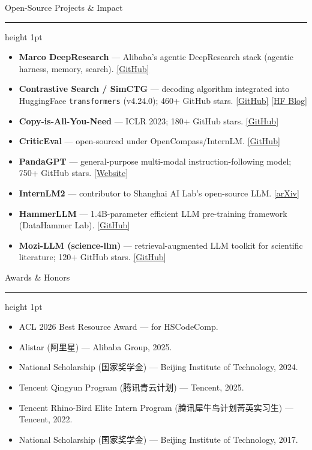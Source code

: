 \documentclass[10.5pt]{article}
\newcommand{\cvsection}[1]{%
  \vspace{10pt}
  {\color{accent}\headingfont\Large #1}\par
  \vspace{2pt}
  {\color{accent}\hrule height 1pt}
  \vspace{6pt}
}
\newcommand{\projlink}[1]{\small\color{accent}[#1]}
\begin{document}
\cvsection{Open-Source Projects \& Impact}
\begin{itemize}
  \item \textbf{Marco DeepResearch} --- Alibaba's agentic DeepResearch stack (agentic harness, memory, search). \href{https://github.com/AIDC-AI/Marco-DeepResearch/}{\projlink{GitHub}}
  \item \textbf{Contrastive Search / SimCTG} --- decoding algorithm integrated into HuggingFace \texttt{transformers} (v4.24.0); 460+ GitHub stars. \href{https://github.com/yxuansu/SimCTG}{\projlink{GitHub}} \href{https://huggingface.co/blog/introducing-csearch}{\projlink{HF Blog}}
  \item \textbf{Copy-is-All-You-Need} --- ICLR 2023; 180+ GitHub stars. \href{https://github.com/gmftbyGMFTBY/Copyisallyouneed}{\projlink{GitHub}}
  \item \textbf{CriticEval} --- open-sourced under OpenCompass/InternLM. \href{https://github.com/open-compass/CriticEval}{\projlink{GitHub}}
  \item \textbf{PandaGPT} --- general-purpose multi-modal instruction-following model; 750+ GitHub stars. \href{https://panda-gpt.github.io/}{\projlink{Website}}
  \item \textbf{InternLM2} --- contributor to Shanghai AI Lab's open-source LLM. \href{https://arxiv.org/abs/2403.17297}{\projlink{arXiv}}
  \item \textbf{HammerLLM} --- 1.4B-parameter efficient LLM pre-training framework (DataHammer Lab). \href{https://github.com/Academic-Hammer/HammerLLM}{\projlink{GitHub}}
  \item \textbf{Mozi-LLM (science-llm)} --- retrieval-augmented LLM toolkit for scientific literature; 120+ GitHub stars. \href{https://github.com/gmftbyGMFTBY/science-llm}{\projlink{GitHub}}
\end{itemize}

\cvsection{Awards \& Honors}
\begin{itemize}
  \item ACL 2026 Best Resource Award --- for HSCodeComp.
  \item Alistar ({\cjkfont 阿里星}) --- Alibaba Group, 2025.
  \item National Scholarship ({\cjkfont 国家奖学金}) --- Beijing Institute of Technology, 2024.
  \item Tencent Qingyun Program ({\cjkfont 腾讯青云计划}) --- Tencent, 2025.
  \item Tencent Rhino-Bird Elite Intern Program ({\cjkfont 腾讯犀牛鸟计划菁英实习生}) --- Tencent, 2022.
  \item National Scholarship ({\cjkfont 国家奖学金}) --- Beijing Institute of Technology, 2017.
\end{itemize}
\end{document}
